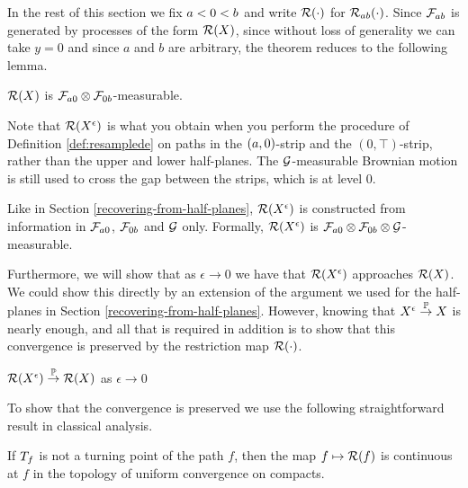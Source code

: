 {In the rest of this
section we fix $a < 0 < b$ and write $\mathcal{R}(\cdot)$ for
$\mathcal{R}_{{a}{b}}(\cdot)$.
Since $\mathcal{F}_{a b}$ is generated by processes of the form $\mathcal{R}(X)$, since
without loss of generality we can take $y=0$ and since $a$ and $b$ are arbitrary, 
the theorem reduces to the following lemma.

\begin{lemma}
  $\mathcal{R}(X)$ is $\mathcal{F}_{a 0} \otimes
  \mathcal{F}_{0 b}$-measurable.
\end{lemma}

\newcommand{\Resresamplede}{\Res{\resamplede}}
\newcommand{\Ressampled}{\Res{\sampled}}

Note that $\Resresamplede$ is what you obtain when you perform the
procedure of Definition \ref{def:resamplede} on paths in the
$(a,0)$-strip and the $(0,\top)$-strip, rather than the upper and lower
half-planes.  The $\mathcal{G}$-measurable Brownian motion is still used to
cross the gap between the strips, which is at level $0$.

Like in Section \ref{recovering-from-half-planes}, $\Resresamplede$
is constructed from information in $\mathcal{F}_{a 0}$,
$\mathcal{F}_{0 b}$ and $\mathcal{G}$ only.
Formally,
  $\mathcal{R}(X^{\epsilon})$ is $\mathcal{F}_{a 0} \otimes \mathcal{F}_{0 b}
  \otimes \mathcal{G}$-measurable.

Furthermore, we will show that as $\epsilon \to 0$ we have that
$\Resresamplede$ approaches $\Ressampled$.  We could show this
directly by an extension of the argument we used for the half-planes
in Section \ref{recovering-from-half-planes}.  However, knowing that
$X^{\epsilon} \overset{\mathbb{P}}\to X$ is nearly enough, and all that is required
in addition is to show that this convergence is preserved by the
restriction map $\mathcal{R}(\cdot)$.

\begin{lemma}
    \label{lem:resamplede-to-sampled-strip}
    $\mathcal{R}(X^{\epsilon}) \overset{\mathbb{P}}\to \mathcal{R}(X)$ as $\epsilon \to 0$
\end{lemma}

To show that the convergence is preserved we use the following
straightforward result in classical analysis.

\newcommand{\stripleavetimenotturningpoint}[1]{$\stripleavetime{#1}$ is
  not a turning point of the path $#1$}

\begin{lemma}
  \label{lem:Res-continuous-ae}
  If \stripleavetimenotturningpoint{f},
  then the map $f \mapsto \mathcal{R}(f)$ is continuous at $f$ in the
  topology of uniform convergence on compacts.
\end{lemma}

}
